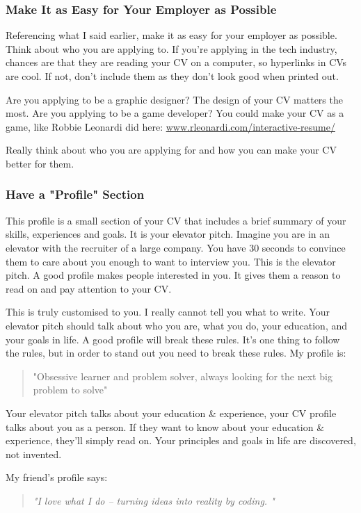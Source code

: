 \documentclass{article}
\begin{document}
\subsubsection{Make It as Easy for Your Employer as Possible}
Referencing what I said earlier, make it as easy for your employer as
possible. Think about who you are applying to. If you're applying in the
tech industry, chances are that they are reading your CV on a computer,
so hyperlinks in CVs are cool. If not, don't include them as they don't
look good when printed out.

Are you applying to be a graphic designer? The design of your CV matters
the most. Are you applying to be a game developer? You could make your
CV as a game, like Robbie Leonardi did here:
\href{http://www.rleonardi.com/interactive-resume/}{{www.rleonardi.com/interactive-resume/}}

Really think about who you are applying for and how you can make your CV
better for them.
\subsubsection{Have a "Profile" Section}
This profile is a small section of your CV that includes a brief summary
of your skills, experiences and goals. It is your elevator pitch.
Imagine you are in an elevator with the recruiter of a large company.
You have 30 seconds to convince them to care about you enough to want to
interview you. This is the elevator pitch. A good profile makes people
interested in you. It gives them a reason to read on and pay attention
to your CV.

This is truly customised to you. I really cannot tell you what to write.
Your elevator pitch should talk about who you are, what you do, your
education, and your goals in life. A good profile will break these
rules. It's one thing to follow the rules, but in order to stand out you
need to break these rules. My profile is:
\begin{quote}
"Obsessive learner and problem solver, always looking for the next big problem to solve"
\end{quote}

Your elevator pitch talks about your education \& experience, your CV
profile talks about you as a person. If they want to know about your
education \& experience, they'll simply read on. Your principles and
goals in life are discovered, not invented.

My friend's profile says:

\begin{quote}
\emph{"I love what I do -- turning ideas into reality by coding. "}
\end{quote}
\end{document}
